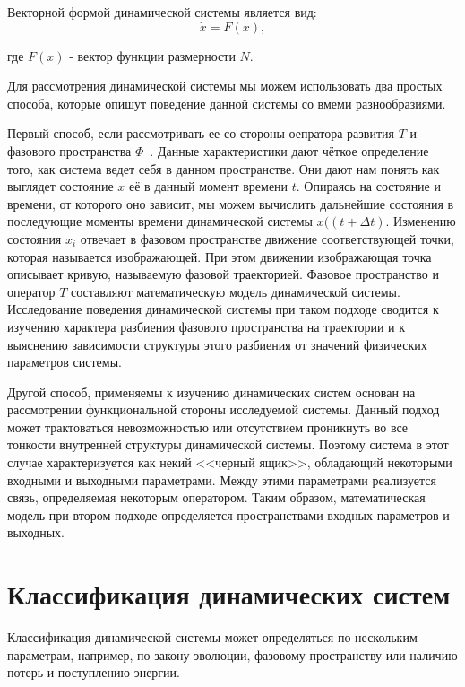 Векторной формой динамической системы является вид:
\begin{equation}
\dot x= F(x),
\end{equation}

\noindent где $F(x)$ - вектор функции размерности $N$.

Для рассмотрения динамической системы мы можем использовать два простых способа, которые опишут поведение данной системы со вмеми разнообразиями. 

Первый способ, если рассмотривать ее со стороны оепратора развития $T$ и фазового пространства $\Phi$~\cite{Tihomirov}. Данные характеристики дают чёткое определение того, как система ведет себя в данном пространстве. Они дают нам понять как выглядет состояние $x$ её в данный момент времени $t$. Опираясь на состояние и времени, от которого оно зависит, мы можем вычислить дальнейшие состояния в последующие моменты времени динамической системы $x((t+\Delta t)$.  Изменению состояния $x_i$ отвечает в фазовом пространстве движение соответствующей точки, которая называется изображающей. При этом движении изображающая точка описывает кривую, называемую фазовой траекторией. Фазовое пространство и оператор $T$ составляют математическую модель динамической системы. Исследование поведения динамической системы при таком подходе сводится к изучению характера разбиения фазового пространства на траектории и к выяснению зависимости структуры этого разбиения от значений физических параметров системы. 

Другой способ, применяемы к изучению динамических систем основан на рассмотрении функциональной стороны исследуемой системы. Данный подход может трактоваться невозможностью или отсутствием проникнуть во все тонкости внутренней структуры динамической системы. Поэтому система в этот случае характеризуется как некий <<черный ящик>>, обладающий некоторыми входными и выходными параметрами. Между этими параметрами реализуется связь, определяемая некоторым оператором. Таким образом, математическая модель при втором подходе определяется пространствами входных параметров и выходных. 

\section{Классификация динамических систем}

Классификация динамической системы может определяться по нескольким параметрам, например, по закону эволюции, фазовому пространству или наличию потерь и поступлению энергии.

